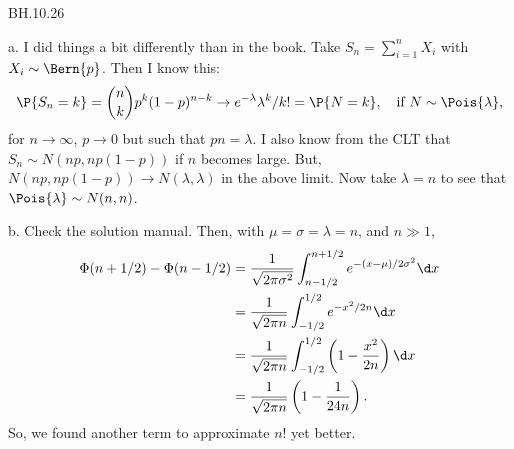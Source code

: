 
\setcounter{theorem}{25}
\begin{exercise} BH.10.26
\begin{solution}
a.
I did things a bit differently than in the book. Take $S_n=\sum_{i=1}^n X_i$ with $X_i\sim\Bern{p}$. Then I know this:
\begin{align*}
\P{S_n=k} = {n \choose k} p^k(1-p)^{n-k} \to e^{-\lambda} \lambda^k/k! = \P{N=k}, \quad\text{if } N\sim\Pois{\lambda},
\end{align*}
for $n\to \infty$, $p\to0$ but such that $p n = \lambda$.
I also know from the CLT that $S_n\sim N(n p, n p(1-p))$ if $n$ becomes large.
But, $N(n p, n p(1-p)) \to N(\lambda, \lambda)$ in the above limit.
Now take $\lambda=n$ to see that $\Pois{\lambda} \sim N(n,n)$.

b.
Check the solution manual. Then, with $\mu=\sigma=\lambda=n$, and $n\gg 1$,
\begin{align*}
\Phi(n+1/2) - \Phi(n-1/2)
&= \frac 1 {\sqrt{2\pi \sigma^{2}}}\int_{n-1/2}^{n+1/2} e^{-(x-\mu)/2\sigma^{2}} \d x\\
&= \frac 1 {\sqrt{2\pi n }}\int_{-1/2}^{1/2} e^{-x^{2}/2n} \d x\\
&= \frac 1 {\sqrt{2\pi n }}\int_{-1/2}^{1/2} \left(1 - \frac{x^{2}}{2n}\right) \d x\\
&= \frac 1 {\sqrt{2\pi n }} \left (1-  \frac{1}{24n}\right ).
\end{align*}
So, we found another term to approximate $n!$ yet better.
\end{solution}
\end{exercise}

